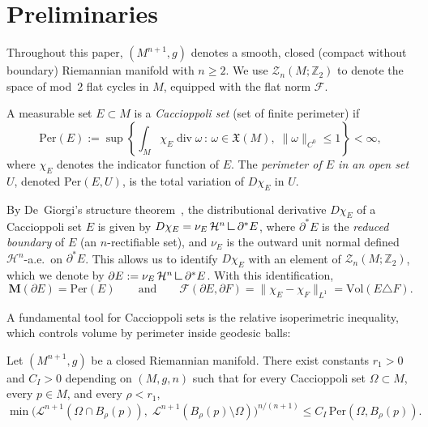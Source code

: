 
\section{Preliminaries}\label{sec:p2-prelim}

Throughout this paper, $(M^{n+1}, g)$ denotes a smooth, closed (compact without boundary) Riemannian manifold with $n \geq 2$. We use $\mathcal{Z}_{n}(M; \mathbb{Z}_2)$ to denote the space of mod~$2$ flat cycles in $M$, equipped with the flat norm $\mathcal{F}$.

\begin{definition}\label{def:p2-caccioppoli}
A measurable set $E \subset M$ is a \emph{Caccioppoli set} (set of finite perimeter) if
\[
\mathrm{Per}(E) := \sup\left\{ \int_M \chi_E \operatorname{div} \omega \,:\, \omega \in \mathfrak{X}(M),\; \|\omega\|_{C^0} \leq 1 \right\} < \infty,
\]
where $\chi_E$ denotes the indicator function of $E$. The \emph{perimeter of $E$ in an open set $U$}, denoted $\mathrm{Per}(E, U)$, is the total variation of $D\chi_E$ in $U$.
\end{definition}

By De~Giorgi's structure theorem~\cite[Theorem~14.3]{Sim84}, the distributional derivative $D\chi_E$ of a Caccioppoli set $E$ is given by $D\chi_E = \nu_E \, \mathcal{H}^n \mres \partial^* E$, where $\partial^* E$ is the \emph{reduced boundary} of $E$ (an $n$-rectifiable set), and $\nu_E$ is the outward unit normal defined $\mathcal{H}^n$-a.e.\ on $\partial^* E$. This allows us to identify $D\chi_E$ with an element of $\mathcal{Z}_n(M; \mathbb{Z}_2)$, which we denote by $\partial E := \nu_E \, \mathcal{H}^n \mres \partial^* E$. With this identification,
\[
\mathbf{M}(\partial E) = \mathrm{Per}(E) \qquad \text{and} \qquad \mathcal{F}(\partial E, \partial F) = \|\chi_E - \chi_F\|_{L^1} = \mathrm{Vol}(E \triangle F).
\]

A fundamental tool for Caccioppoli sets is the relative isoperimetric inequality, which controls volume by perimeter inside geodesic balls:

\begin{proposition}\label{prop:relative-isoperimetric}
Let $(M^{n+1}, g)$ be a closed Riemannian manifold. There exist constants $r_1 > 0$ and $C_I > 0$ depending on $(M, g, n)$ such that for every Caccioppoli set $\Omega \subset M$, every $p \in M$, and every $\rho < r_1$,
\begin{equation}\label{eq:rel-isop}
    \min\bigl(\mathcal{L}^{n+1}(\Omega \cap B_\rho(p)),\; \mathcal{L}^{n+1}(B_\rho(p) \setminus \Omega)\bigr)^{n/(n+1)} \leq C_I\, \mathrm{Per}(\Omega, B_\rho(p)).
\end{equation}
\end{proposition}

